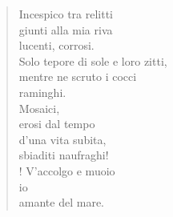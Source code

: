 
\begin{verse}
    Incespico tra relitti\\
    giunti alla mia riva\\
    lucenti, corrosi.\\
    Solo tepore di sole e loro zitti,\\
    mentre ne scruto i cocci\\
    raminghi.\\
    Mosaici,\\
    erosi dal tempo\\
    d'una vita subita,\\
    sbiaditi naufraghi!\\!
    V'accolgo e muoio\\
    io\\
    amante del mare.
\end{verse}